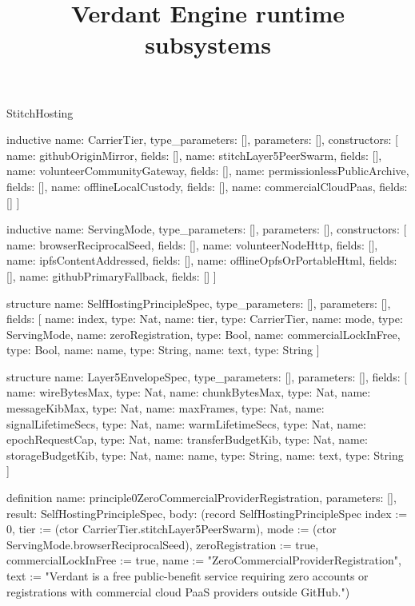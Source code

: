 \begin{lexlean}{StitchHosting}
\title{Verdant Engine runtime subsystems}
\begin{semanticmodule}
inductive{
  name: CarrierTier,
  type_parameters: [],
  parameters: [],
  constructors: [
    {name: githubOriginMirror, fields: []},
    {name: stitchLayer5PeerSwarm, fields: []},
    {name: volunteerCommunityGateway, fields: []},
    {name: permissionlessPublicArchive, fields: []},
    {name: offlineLocalCustody, fields: []},
    {name: commercialCloudPaas, fields: []}
  ]
}

inductive{
  name: ServingMode,
  type_parameters: [],
  parameters: [],
  constructors: [
    {name: browserReciprocalSeed, fields: []},
    {name: volunteerNodeHttp, fields: []},
    {name: ipfsContentAddressed, fields: []},
    {name: offlineOpfsOrPortableHtml, fields: []},
    {name: githubPrimaryFallback, fields: []}
  ]
}

structure{
  name: SelfHostingPrincipleSpec,
  type_parameters: [],
  parameters: [],
  fields: [
    {name: index, type: Nat},
    {name: tier, type: CarrierTier},
    {name: mode, type: ServingMode},
    {name: zeroRegistration, type: Bool},
    {name: commercialLockInFree, type: Bool},
    {name: name, type: String},
    {name: text, type: String}
  ]
}

structure{
  name: Layer5EnvelopeSpec,
  type_parameters: [],
  parameters: [],
  fields: [
    {name: wireBytesMax, type: Nat},
    {name: chunkBytesMax, type: Nat},
    {name: messageKibMax, type: Nat},
    {name: maxFrames, type: Nat},
    {name: signalLifetimeSecs, type: Nat},
    {name: warmLifetimeSecs, type: Nat},
    {name: epochRequestCap, type: Nat},
    {name: transferBudgetKib, type: Nat},
    {name: storageBudgetKib, type: Nat},
    {name: name, type: String},
    {name: text, type: String}
  ]
}

definition{
  name: principle0ZeroCommercialProviderRegistration,
  parameters: [],
  result: SelfHostingPrincipleSpec,
  body: (record SelfHostingPrincipleSpec {index := 0, tier := (ctor CarrierTier.stitchLayer5PeerSwarm), mode := (ctor ServingMode.browserReciprocalSeed), zeroRegistration := true, commercialLockInFree := true, name := "ZeroCommercialProviderRegistration", text := "Verdant is a free public-benefit service requiring zero accounts or registrations with commercial cloud PaaS providers outside GitHub."})
}


\end{semanticmodule}
\end{lexlean}
